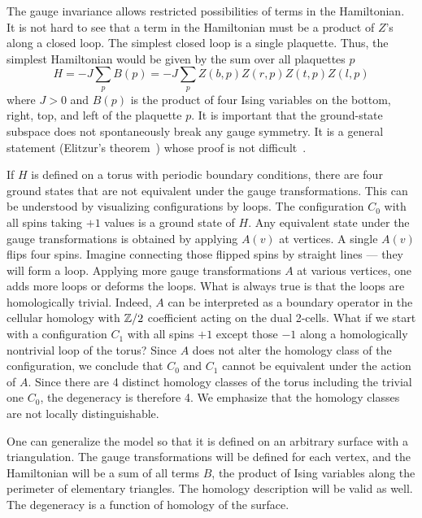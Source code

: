 The gauge invariance allows restricted possibilities of terms in the Hamiltonian.
It is not hard to see that a term in the Hamiltonian must be a product of $Z$'s along a closed loop.
The simplest closed loop is a single plaquette. Thus, the simplest Hamiltonian would be given by the sum over all plaquettes $p$
\begin{equation}
 H = -J \sum_p B(p) = - J \sum_p Z(b,p) Z(r,p) Z(t,p) Z(l,p)
\label{eq:2D-Ising-gauge}
\end{equation}
where $J > 0$ and $B(p)$ is the product of four Ising variables on the bottom, right, top, and left of the plaquette $p$. It is important that the ground-state subspace does not spontaneously break any gauge symmetry. It is a general statement (Elitzur's theorem~\cite{Elitzur1975}) whose proof is not difficult~\cite{Kogut1979LGT,ChesiLossBravyiEtAl2010Thermodynamic}.


If $H$ is defined on a torus with periodic boundary conditions, there are four ground states that are not equivalent under the gauge transformations. This can be understood by visualizing configurations by loops. The configuration $C_0$ with all spins taking $+1$ values is a ground state of $H$. Any equivalent state under the gauge transformations is obtained by applying $A(v)$ at vertices. A single $A(v)$  flips four spins. Imagine connecting those flipped spins by straight lines --- they will form a loop. Applying more gauge transformations $A$ at various vertices, one adds more loops or deforms the loops. What is always true is that the loops are homologically trivial. Indeed, $A$ can be interpreted as a boundary operator in the cellular homology with $\mathbb{Z}/2$ coefficient acting on the dual 2-cells. What if we start with a configuration $C_1$ with all spins $+1$ except those $-1$ along a homologically nontrivial loop of the torus? Since $A$ does not alter the homology class of the configuration, we conclude that $C_0$ and $C_1$ cannot be equivalent under the action of $A$. Since there are 4 distinct homology classes of the torus including the trivial one $C_0$, the degeneracy is therefore 4. We emphasize that the homology classes are not locally distinguishable.

One can generalize the model so that it is defined on an arbitrary surface with a triangulation. The gauge transformations will be defined for each vertex, and the Hamiltonian will be a sum of all terms $B$, the product of Ising variables along the perimeter of elementary triangles. The homology description will be valid as well. The degeneracy is a function of homology of the surface.

